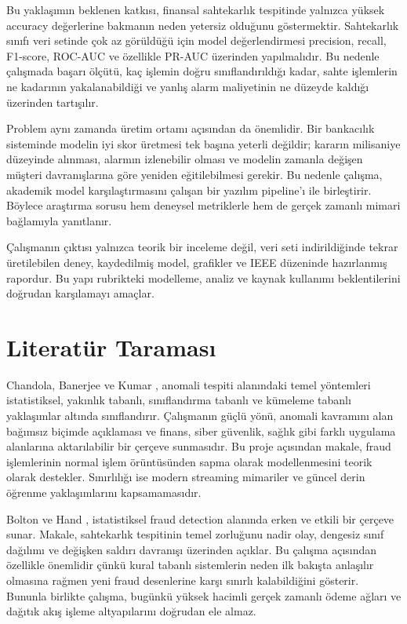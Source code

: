 \documentclass[conference]{IEEEtran}
\begin{document}
Bu yaklaşımın beklenen katkısı, finansal sahtekarlık tespitinde yalnızca yüksek accuracy değerlerine bakmanın neden yetersiz olduğunu göstermektir. Sahtekarlık sınıfı veri setinde çok az görüldüğü için model değerlendirmesi precision, recall, F1-score, ROC-AUC ve özellikle PR-AUC üzerinden yapılmalıdır. Bu nedenle çalışmada başarı ölçütü, kaç işlemin doğru sınıflandırıldığı kadar, sahte işlemlerin ne kadarının yakalanabildiği ve yanlış alarm maliyetinin ne düzeyde kaldığı üzerinden tartışılır.

Problem aynı zamanda üretim ortamı açısından da önemlidir. Bir bankacılık sisteminde modelin iyi skor üretmesi tek başına yeterli değildir; kararın milisaniye düzeyinde alınması, alarmın izlenebilir olması ve modelin zamanla değişen müşteri davranışlarına göre yeniden eğitilebilmesi gerekir. Bu nedenle çalışma, akademik model karşılaştırmasını çalışan bir yazılım pipeline'ı ile birleştirir. Böylece araştırma sorusu hem deneysel metriklerle hem de gerçek zamanlı mimari bağlamıyla yanıtlanır.

Çalışmanın çıktısı yalnızca teorik bir inceleme değil, veri seti indirildiğinde tekrar üretilebilen deney, kaydedilmiş model, grafikler ve IEEE düzeninde hazırlanmış rapordur. Bu yapı rubrikteki modelleme, analiz ve kaynak kullanımı beklentilerini doğrudan karşılamayı amaçlar.

\section{Literatür Taraması}

Chandola, Banerjee ve Kumar \cite{chandola2009}, anomali tespiti alanındaki temel yöntemleri istatistiksel, yakınlık tabanlı, sınıflandırma tabanlı ve kümeleme tabanlı yaklaşımlar altında sınıflandırır. Çalışmanın güçlü yönü, anomali kavramını alan bağımsız biçimde açıklaması ve finans, siber güvenlik, sağlık gibi farklı uygulama alanlarına aktarılabilir bir çerçeve sunmasıdır. Bu proje açısından makale, fraud işlemlerinin normal işlem örüntüsünden sapma olarak modellenmesini teorik olarak destekler. Sınırlılığı ise modern streaming mimariler ve güncel derin öğrenme yaklaşımlarını kapsamamasıdır.

Bolton ve Hand \cite{bolton2002}, istatistiksel fraud detection alanında erken ve etkili bir çerçeve sunar. Makale, sahtekarlık tespitinin temel zorluğunu nadir olay, dengesiz sınıf dağılımı ve değişken saldırı davranışı üzerinden açıklar. Bu çalışma açısından özellikle önemlidir çünkü kural tabanlı sistemlerin neden ilk bakışta anlaşılır olmasına rağmen yeni fraud desenlerine karşı sınırlı kalabildiğini gösterir. Bununla birlikte çalışma, bugünkü yüksek hacimli gerçek zamanlı ödeme ağları ve dağıtık akış işleme altyapılarını doğrudan ele almaz.
\end{document}
